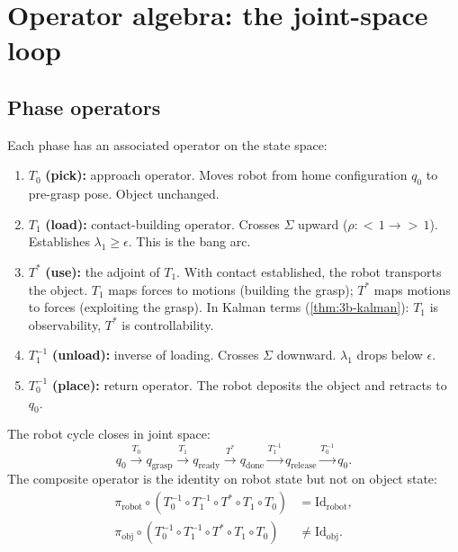 \section{Operator algebra: the joint-space loop}
\label{sec:m-operators}

\subsection{Phase operators}

Each phase has an associated operator on the state space:

\begin{definition}\label{def:m-operators}
\leavevmode
\begin{enumerate}[label=(\roman*),nosep]
  \item $T_0$ \textbf{(pick):} approach operator. Moves robot from
  home configuration $q_0$ to pre-grasp pose.  Object unchanged.
  \item $T_1$ \textbf{(load):} contact-building operator. Crosses
  $\Sigma$ upward ($\rho \colon {<}\,1 \to {>}\,1$).  Establishes
  $\lambda_1 \ge \epsilon$.  This is the bang arc.
  \item $T^*$ \textbf{(use):} the adjoint of $T_1$.  With contact
  established, the robot transports the object.
  $T_1$ maps forces to motions (building the grasp); $T^*$ maps
  motions to forces (exploiting the grasp).  In Kalman terms
  (\cref{thm:3b-kalman}): $T_1$ is observability, $T^*$ is
  controllability.
  \item $T_1^{-1}$ \textbf{(unload):} inverse of loading.
  Crosses $\Sigma$ downward.  $\lambda_1$ drops below $\epsilon$.
  \item $T_0^{-1}$ \textbf{(place):} return operator.  The robot
  deposits the object and retracts to $q_0$.
\end{enumerate}
\end{definition}

\begin{theorem}\label{thm:m-loop}
The robot cycle closes in joint space:
\[
  q_0 \xrightarrow{T_0} q_\mathrm{grasp}
  \xrightarrow{T_1} q_\mathrm{ready}
  \xrightarrow{T^*} q_\mathrm{done}
  \xrightarrow{T_1^{-1}} q_\mathrm{release}
  \xrightarrow{T_0^{-1}} q_0.
\]
The composite operator is the identity on robot state but not on
object state:
\begin{align}
  \pi_\mathrm{robot} \circ
    (T_0^{-1} \circ T_1^{-1} \circ T^* \circ T_1 \circ T_0)
    &= \mathrm{Id}_\mathrm{robot}, \label{eq:m-robot-loop} \\
  \pi_\mathrm{obj} \circ
    (T_0^{-1} \circ T_1^{-1} \circ T^* \circ T_1 \circ T_0)
    &\neq \mathrm{Id}_\mathrm{obj}. \label{eq:m-obj-irrev}
\end{align}
\end{theorem}

